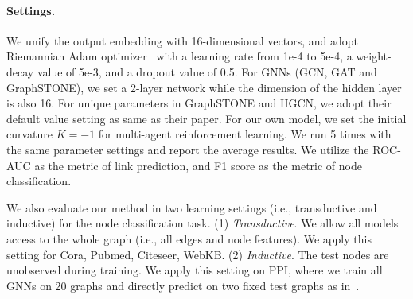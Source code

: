 \paragraph{Settings.}
We unify the output embedding with 16-dimensional vectors, and adopt Riemannian Adam optimizer~\cite{NickelK17Poincare} with a learning rate from 1e-4 to 5e-4, a weight-decay value of 5e-3, and a dropout value of 0.5. 
For GNNs (GCN, GAT and GraphSTONE), we set a 2-layer network while the dimension of the hidden layer is also 16. 
For unique parameters in GraphSTONE and HGCN, we adopt their default value setting as same as their paper. 
For our own model, we set the initial curvature $K=-1$ for multi-agent reinforcement learning. 
We run 5 times with the same parameter settings and report the average results. 
We utilize the ROC-AUC as the metric of link prediction, and F1 score as the metric of node classification. 

We also evaluate our method in two learning settings (i.e., transductive and inductive) for the node classification task. 
(1) \textit{Transductive}. 
We allow all models access to the whole graph (i.e., all edges and node features). 
We apply this setting for Cora, Pubmed, Citeseer, WebKB. 
(2) \textit{Inductive}. 
The test nodes are unobserved during training. We apply this setting on PPI, where we train all GNNs on 20 graphs and directly predict on two fixed test graphs as in~\cite{hamilton2017inductive}. 

